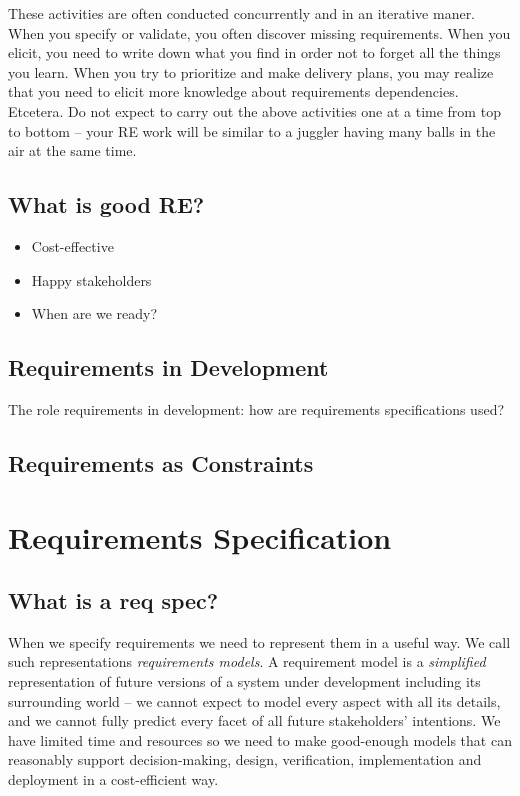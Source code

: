 These activities are often conducted concurrently and in an iterative maner. When you specify or validate, you often discover missing requirements. When you elicit, you need to write down what you find in order not to forget all the things you learn. When you try to prioritize and make delivery plans, you may realize that you need to elicit more knowledge about requirements dependencies. Etcetera. Do not expect to carry out the above activities one at a time from top to bottom -- your RE work will be similar to a juggler having many balls in the air at the same time. 

\subsection{What is good RE?}

\begin{itemize}
  \item Cost-effective
  \item Happy stakeholders
  \item When are we ready?
\end{itemize}

\subsection{Requirements in Development}
The role requirements in development: how are requirements specifications used?

\subsection{Requirements as Constraints}


\section{Requirements Specification}



\subsection{What is a req spec?}


When we specify requirements we need to represent them in a useful way. We call such representations \textit{requirements models}. A requirement model is a \emph{simplified} representation of future versions of a system under development including its surrounding world -- we cannot expect to model every aspect with all its details, and we cannot fully predict every facet of all future stakeholders' intentions. We have limited time and resources so we need to make good-enough models that can reasonably support decision-making, design, verification, implementation and deployment in a cost-efficient way.

